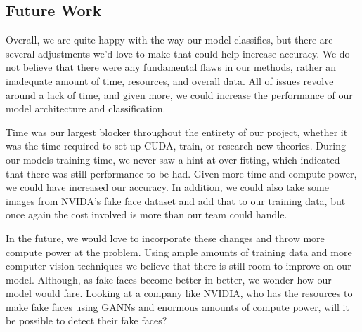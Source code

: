 \documentclass[11pt, letterpaper]{article}
\begin{document}
\begin{multicols}{2}
  \subsection{Future Work}
  Overall, we are quite happy with the way our model classifies, but there are
  several adjustments we'd love to make that could help increase accuracy. We do
  not believe that there were any fundamental flaws in our methods, rather an
  inadequate amount of time, resources, and overall data. All of issues revolve
  around a lack of time, and given more, we could increase the performance of
  our model architecture and classification.

  Time was our largest blocker throughout the entirety of our project, whether
  it was the time required to set up CUDA, train, or research new theories.
  During our models training time, we never saw a hint at over fitting, which
  indicated that there was still performance to be had. Given more time and
  compute power, we could have increased our accuracy. In addition, we could
  also take some images from NVIDA's fake face dataset and add that to our
  training data, but once again the cost involved is more than our team could
  handle.

  In the future, we would love to incorporate these changes and throw more
  compute power at the problem. Using ample amounts of training data and more
  computer vision techniques we believe that there is still room to improve on
  our model. Although, as fake faces become better in better, we wonder how our
  model would fare. Looking at a company like NVIDIA, who has the resources to
  make fake faces using GANNs and enormous amounts of compute power, will it be
  possible to detect their fake faces?

\end{multicols}



\end{document}
